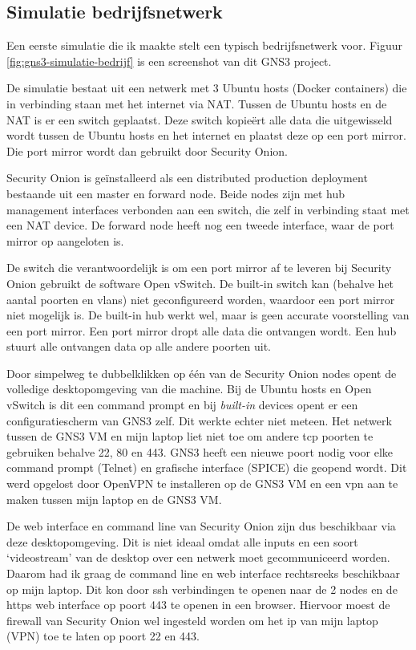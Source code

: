 \documentclass[a4paper,12pt]{report}
\begin{document}
\subsection{Simulatie bedrijfsnetwerk}

Een eerste simulatie die ik maakte stelt een typisch bedrijfsnetwerk voor.
Figuur \ref{fig:gns3-simulatie-bedrijf} is een screenshot van dit GNS3 project.

De simulatie bestaat uit een netwerk met 3 Ubuntu hosts (Docker containers) die in verbinding staan met het internet via NAT.
Tussen de Ubuntu hosts en de NAT is er een switch geplaatst.
Deze switch kopieërt alle data die uitgewisseld wordt tussen de Ubuntu hosts en het internet en plaatst deze op een port mirror.
Die port mirror wordt dan gebruikt door Security Onion.

Security Onion is geïnstalleerd als een distributed production deployment bestaande uit een master en forward node. 
Beide nodes zijn met hub management interfaces verbonden aan een switch, die zelf in verbinding staat met een NAT device.
De forward node heeft nog een tweede interface, waar de port mirror op aangeloten is.

De switch die verantwoordelijk is om een port mirror af te leveren bij Security Onion gebruikt de software Open vSwitch.
De built-in switch kan (behalve het aantal poorten en vlans) niet geconfigureerd worden, waardoor een port mirror niet mogelijk is.
De built-in hub werkt wel, maar is geen accurate voorstelling van een port mirror.
Een port mirror dropt alle data die ontvangen wordt.
Een hub stuurt alle ontvangen data op alle andere poorten uit.

Door simpelweg te dubbelklikken op één van de Security Onion nodes opent de volledige desktopomgeving van die machine.
Bij de Ubuntu hosts en Open vSwitch is dit een command prompt en bij \emph{built-in} devices opent er een configuratiescherm van GNS3 zelf.
Dit werkte echter niet meteen.
Het netwerk tussen de GNS3 VM en mijn laptop liet niet toe om andere tcp poorten te gebruiken behalve 22, 80 en 443.
GNS3 heeft een nieuwe poort nodig voor elke command prompt (Telnet) en grafische interface (SPICE) die geopend wordt.
Dit werd opgelost door OpenVPN te installeren op de GNS3 VM en een vpn aan te maken tussen mijn laptop en de GNS3 VM.

De web interface en command line van Security Onion zijn dus beschikbaar via deze desktopomgeving.
Dit is niet ideaal omdat alle inputs en een soort `videostream' van de desktop over een netwerk moet gecommuniceerd worden.
Daarom had ik graag de command line en web interface rechtsreeks beschikbaar op mijn laptop.
Dit kon door ssh verbindingen te openen naar de 2 nodes en de https web interface op poort 443 te openen in een browser.
Hiervoor moest de firewall van Security Onion wel ingesteld worden om het ip van mijn laptop (VPN) toe te laten op poort 22 en 443.
\end{document}
